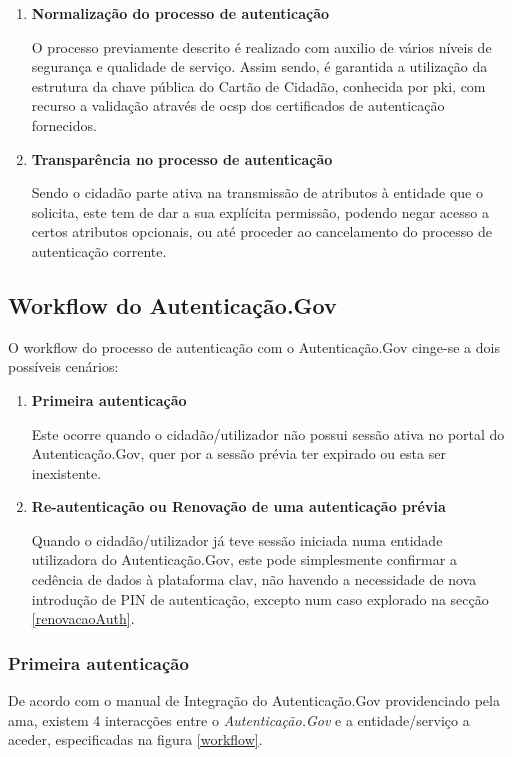 \begin{enumerate}
    \item \textbf{Normalização do processo de autenticação}
    
    O processo previamente descrito é realizado com auxilio de vários níveis de segurança e qualidade de serviço. Assim sendo, é garantida a utilização da estrutura da chave pública do Cartão de Cidadão, conhecida por \gls{pki}, com recurso a validação através de \gls{ocsp} dos certificados de autenticação fornecidos.
    
    \item \textbf{Transparência no processo de autenticação}
    
    Sendo o cidadão parte ativa na transmissão de atributos à entidade que o solicita, este tem de dar a sua explícita permissão, podendo negar acesso a certos atributos opcionais, ou até proceder ao cancelamento do processo de autenticação corrente.
\end{enumerate}

\cleardoublepage
\subsection{Workflow do Autenticação.Gov}

O workflow do processo de autenticação com o Autenticação.Gov cinge-se a dois possíveis cenários:

\begin{enumerate}
    \item \textbf{Primeira autenticação}
    
    Este ocorre quando o cidadão/utilizador não possui sessão ativa no portal do Autenticação.Gov, quer por a sessão prévia ter expirado ou esta ser inexistente.
    
    \item \textbf{Re-autenticação ou Renovação de uma autenticação prévia}
    
    Quando o cidadão/utilizador já teve sessão iniciada numa entidade utilizadora do Autenticação.Gov, este pode simplesmente confirmar a cedência de dados à plataforma \gls{clav}, não havendo a necessidade de nova introdução de PIN de autenticação, excepto num caso explorado na secção \ref{renovacaoAuth}.
\end{enumerate}

\subsubsection{Primeira autenticação}
De acordo com o manual de Integração do Autenticação.Gov\cite{manualAuthGov} providenciado pela \gls{ama}, existem 4 interacções entre o \emph{Autenticação.Gov} e a entidade/serviço a aceder, especificadas na figura \ref{workflow}.

